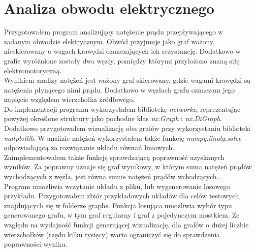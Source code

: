 \documentclass{article}
\begin{document}
        
    \section{Analiza obwodu elektrycznego}
        Przygotowałem program analizujący natężenie prądu przepływającego w zadanym obwodzie elektrycznym. Obwód przyjmuje jako graf ważony, nieskierowany o wagach krawędzi oznaczających ich rezystancję. Dodatkowo w grafie wyróżnione zostały dwa węzły, pomiędzy którymi przyłożono znaną siłę elektromotoryczną. \\
        Wynikiem analizy natężeń jest ważony graf skierowany, gdzie wagami krawędzi są natężenia płynącego nimi prądu. Dodatkowo w węzłach grafu oznaczam jego napięcie względem wierzchołka źródłowego.\\
        Do implementacji programu wykorzystałem bibliotekę \textit{networkx}, reprezentując powyżej określone struktury jako pochodne klas \textit{nx.Graph} i \textit{nx.DiGraph}. Dodatkowo przygotowałem wizualizację obu grafów przy wykorzystaniu biblioteki \textit{matplotlib}. W analizie natężeń wykorzystałem także funkcję \textit{numpy.linalg.solve} odpowiadającą za rozwiązanie układu równań liniowych.\\
        Zaimplementowałem także funkcję sprawdzającą poprawność uzyskanych wyników. Za poprawny uznaje się graf wynikowy, w którym suma natężeń prądów wychodzących z węzła, jest równa sumie natężeń prądów wchodzących. \\
        Program umożliwia wczytanie układu z pliku, lub wygenerowanie losowego przykładu. Przygotowałem zbiór przykładowych układów dla celów testowych, znajdujących się w folderze graphs. Funkcja losująca umożliwia wybór typu generowanego grafu, w tym graf regularny i graf z pojedynczym mostkiem. Ze względu na wydajność funkcji generującej wizualizację, dla grafów o dużej liczbie wierzchołków (rzędu kilku tysięcy) warto ograniczyć się do sprawdzenia poprawności wyniku. \\
\end{document}
